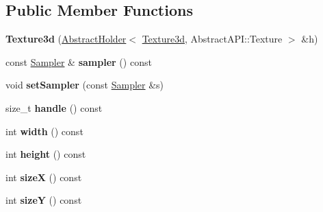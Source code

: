 \subsection*{Public Member Functions}
\begin{DoxyCompactItemize}
\item 
\hypertarget{class_tempest_1_1_texture3d_a1bc79a2893b34e2bf05140d30a3b6c29}{{\bfseries Texture3d} (\hyperlink{class_tempest_1_1_abstract_holder}{Abstract\+Holder}$<$ \hyperlink{class_tempest_1_1_texture3d}{Texture3d}, Abstract\+A\+P\+I\+::\+Texture $>$ \&h)}\label{class_tempest_1_1_texture3d_a1bc79a2893b34e2bf05140d30a3b6c29}

\item 
\hypertarget{class_tempest_1_1_texture3d_acb796a70880fdb0c7f51cc607c9197d9}{const \hyperlink{struct_tempest_1_1_texture3d_1_1_sampler}{Sampler} \& {\bfseries sampler} () const }\label{class_tempest_1_1_texture3d_acb796a70880fdb0c7f51cc607c9197d9}

\item 
\hypertarget{class_tempest_1_1_texture3d_a7aaaba8aa4e01deb8f4a281bb310c720}{void {\bfseries set\+Sampler} (const \hyperlink{struct_tempest_1_1_texture3d_1_1_sampler}{Sampler} \&s)}\label{class_tempest_1_1_texture3d_a7aaaba8aa4e01deb8f4a281bb310c720}

\item 
\hypertarget{class_tempest_1_1_texture3d_ad64d3771c6c2c082901178ad092a0aea}{size\+\_\+t {\bfseries handle} () const }\label{class_tempest_1_1_texture3d_ad64d3771c6c2c082901178ad092a0aea}

\item 
\hypertarget{class_tempest_1_1_texture3d_a030d32d7a7e6698a196c4b3b96f332bc}{int {\bfseries width} () const }\label{class_tempest_1_1_texture3d_a030d32d7a7e6698a196c4b3b96f332bc}

\item 
\hypertarget{class_tempest_1_1_texture3d_a3537afc95c18bd24e114f29c47d3c369}{int {\bfseries height} () const }\label{class_tempest_1_1_texture3d_a3537afc95c18bd24e114f29c47d3c369}

\item 
\hypertarget{class_tempest_1_1_texture3d_ab99cd430658d3b22caf6ac13ff5d71a4}{int {\bfseries size\+X} () const }\label{class_tempest_1_1_texture3d_ab99cd430658d3b22caf6ac13ff5d71a4}

\item 
\hypertarget{class_tempest_1_1_texture3d_ae95434fe247e86c71b6c88ac2481d5e6}{int {\bfseries size\+Y} () const }\label{class_tempest_1_1_texture3d_ae95434fe247e86c71b6c88ac2481d5e6}


\end{DoxyCompactItemize}
